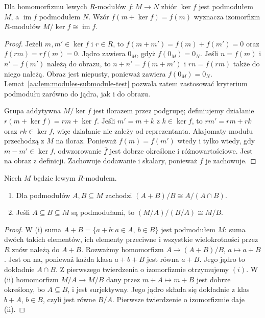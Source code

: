\begin{twierdzenie}
\label{aa:tw:modules-first-isomorphism}
Dla homomorfizmu lewych $R$-modułów $f:M\to N$
zbiór $\ker f$ jest podmodułem $M$, a
$\operatorname{im}f$ podmodułem $N$. Wzór
$\bar f(m+\ker f)=f(m)$ wyznacza izomorfizm
$R$-modułów $M/\ker f\cong\operatorname{im}f$.
\end{twierdzenie}
\begin{proof}
Jeżeli $m,m'\in\ker f$ i $r\in R$, to
$f(m+m')=f(m)+f(m')=0$ oraz $f(rm)=rf(m)=0$.
Jądro zawiera $0_M$, gdyż $f(0_M)=0_N$.
Jeśli $n=f(m)$ i $n'=f(m')$ należą do obrazu,
to $n+n'=f(m+m')$ i $rn=f(rm)$ także do niego należą.
Obraz jest niepusty, ponieważ zawiera $f(0_M)=0_N$.
Lemat~\ref{aa:lem:modules-submodule-test} pozwala zatem
zastosować kryterium podmodułu zarówno do jądra,
jak i do obrazu.

Grupa addytywna $M/\ker f$ jest ilorazem przez
podgrupę; definiujemy działanie $r(m+\ker f)=rm+\ker f$.
Jeśli $m'=m+k$ z $k\in\ker f$, to
$rm'=rm+rk$ oraz $rk\in\ker f$, więc działanie
nie zależy od reprezentanta. Aksjomaty modułu
przechodzą z $M$ na iloraz. Ponieważ
$f(m)=f(m')$ wtedy i tylko wtedy, gdy
$m-m'\in\ker f$, odwzorowanie $\bar f$
jest dobrze określone i różnowartościowe.
Jest na obraz z definicji. Zachowuje dodawanie
i skalary, ponieważ $f$ je zachowuje.
\end{proof}

\begin{twierdzenie}
\label{aa:tw:modules-second-third}
Niech $M$ będzie lewym $R$-modułem.
\begin{enumerate}[label=\textup{(\roman*)}]
\item Dla podmodułów $A,B\subseteq M$ zachodzi
$(A+B)/B\cong A/(A\cap B)$.
\item Jeśli $A\subseteq B\subseteq M$ są podmodułami,
to $(M/A)/(B/A)\cong M/B$.
\end{enumerate}
\end{twierdzenie}
\begin{proof}
W (i) suma $A+B=\{a+b:a\in A,\ b\in B\}$
jest podmodułem $M$: suma dwóch takich elementów,
ich elementy przeciwne i wszystkie wielokrotności
przez $R$ znów należą do $A+B$.
Rozważmy homomorfizm $A\to(A+B)/B$,
$a\mapsto a+B$. Jest on na, ponieważ każda klasa
$a+b+B$ jest równa $a+B$. Jego jądro to dokładnie
$A\cap B$. Z pierwszego twierdzenia o izomorfizmie
otrzymujemy $(i)$. W (ii) homomorfizm
$M/A\to M/B$ dany przez $m+A\mapsto m+B$
jest dobrze określony, bo $A\subseteq B$, i jest
surjektywny. Jego jądro składa się dokładnie z
klas $b+A$, $b\in B$, czyli jest równe $B/A$.
Pierwsze twierdzenie o izomorfizmie daje (ii).
\end{proof}

